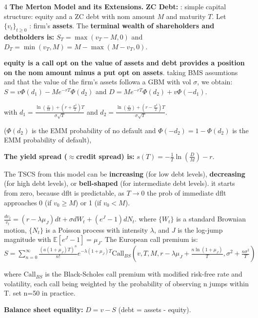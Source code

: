 \documentclass[landscape]{article}
\newcommand{\concept}[1]{\textcolor{conceptcolor}{\textbf{#1}}}
\begin{document}
\begin{multicols}{4}
\textcolor{subsectioncolor}{\textbf{The Merton Model and its Extensions.}}
\textcolor{subsubsectioncolor}{\textbf{ZC Debt:}} \textbf{}: simple capital structure: equity and a ZC debt with nom amount $M$ and maturity $T$. Let $\{v_t\}_{t \geq 0}$ : firm's \textbf{assets}. The \textbf{terminal wealth of shareholders and debtholders is:} $S_T = \max(v_T - M, 0)$ and $D_T = \min(v_T, M) = M - \max(M - v_T, 0)$.

\textbf{equity is a call opt on the value of assets and debt provides a position on the nom amount minus a put opt on assets}. taking BMS assumtions and that the value of the firm's assets followa a GBM with vol $\sigma$, we obtain: $S = v\Phi(d_1) - Me^{-rT}\Phi(d_2)$ and $D = Me^{-rT}\Phi(d_2) + v\Phi(-d_1)$.

with $d_1 = \frac{\ln\left(\frac{v}{M}\right) + \left(r + \frac{\sigma^2}{2}\right)T}{\sigma\sqrt{T}}$ and $d_2 = \frac{\ln\left(\frac{v}{M}\right) + \left(r - \frac{\sigma^2}{2}\right)T}{\sigma\sqrt{T}}$.

($\Phi(d_2)$ is the EMM probability of no default and $\Phi(-d_2) = 1 - \Phi(d_2)$ is the EMM probability of default),

\textbf{The yield spread ($\approx$credit spread) is:} $s(T) = -\frac{1}{T}\ln\left(\frac{D}{M}\right) - r$.

The TSCS from this model can be \textbf{increasing} (for low debt levels), \textbf{decreasing} (for high debt levels), or \textbf{bell-shaped} (for intermediate debt levels). it starts from zero, because dflt is predictable, as $T \to 0$ the prob of immediate dflt approaches 0 (if $v_0 \geq M$) or 1 (if $v_0 < M$).

\textbf{} $\frac{dv_t}{v_t} = (r - \lambda\mu_J)dt + \sigma dW_t + (e^J - 1)dN_t$.
where $\{W_t\}$ is a standard Brownian motion, $\{N_t\}$ is a Poisson process with intensity $\lambda$, and $J$ is the log-jump magnitude with $\mathbb{E}[e^J - 1] = \mu_J$.
The European call premium is: $S = \sum_{n=0}^{\infty} \frac{(a(1+\mu_J)T)^n}{n!}e^{-\lambda(1+\mu_J)T}\text{Call}_{BS}\left(v, T, M, r -\lambda \mu_J + \frac{n\ln(1+\mu_J)}{T}, \sigma^2 + \frac{n\sigma^2}{T}\right)$

where $\text{Call}_{BS}$ is the Black-Scholes call premium  with modified risk-free rate and volatility, each call being weighted by the 
probability of observing n jumps within T. set n=50 in practice.

\concept{Balance sheet equality:} $D = v - S$ (debt = assets - equity).


\end{multicols}
\end{document}
